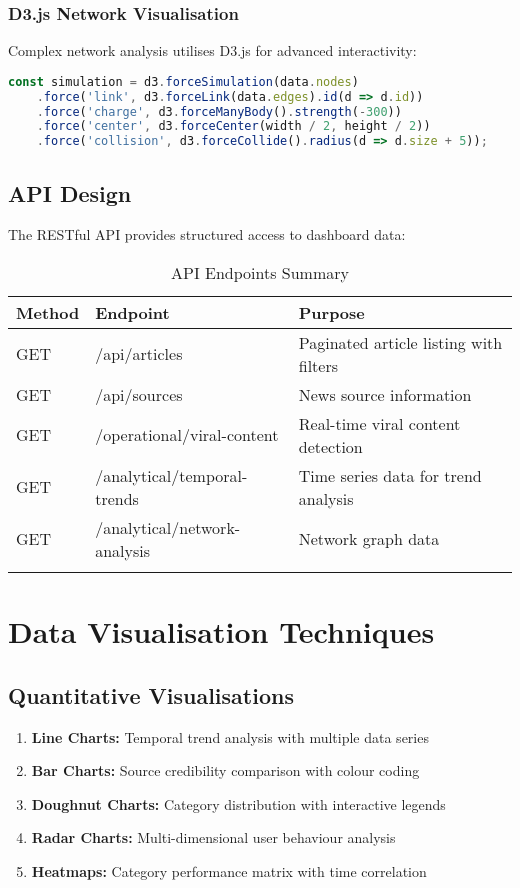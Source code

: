 \documentclass[12pt,a4paper]{article}
\begin{document}
\subsubsection{D3.js Network Visualisation}
Complex network analysis utilises D3.js for advanced interactivity:

\begin{lstlisting}[language=JavaScript, caption=D3.js Force Simulation]
const simulation = d3.forceSimulation(data.nodes)
    .force('link', d3.forceLink(data.edges).id(d => d.id))
    .force('charge', d3.forceManyBody().strength(-300))
    .force('center', d3.forceCenter(width / 2, height / 2))
    .force('collision', d3.forceCollide().radius(d => d.size + 5));
\end{lstlisting}

\subsection{API Design}
The RESTful API provides structured access to dashboard data:

\begin{longtable}{|p{2cm}|p{4cm}|p{8cm}|}
\hline
\textbf{Method} & \textbf{Endpoint} & \textbf{Purpose} \\
\hline
\endhead
GET & /api/articles & Paginated article listing with filters \\
GET & /api/sources & News source information \\
GET & /operational/viral-content & Real-time viral content detection \\
GET & /analytical/temporal-trends & Time series data for trend analysis \\
GET & /analytical/network-analysis & Network graph data \\
\hline
\caption{API Endpoints Summary}
\end{longtable}

\section{Data Visualisation Techniques}

\subsection{Quantitative Visualisations}
\begin{enumerate}
    \item \textbf{Line Charts:} Temporal trend analysis with multiple data series
    \item \textbf{Bar Charts:} Source credibility comparison with colour coding
    \item \textbf{Doughnut Charts:} Category distribution with interactive legends
    \item \textbf{Radar Charts:} Multi-dimensional user behaviour analysis
    \item \textbf{Heatmaps:} Category performance matrix with time correlation
\end{enumerate}
\end{document}
